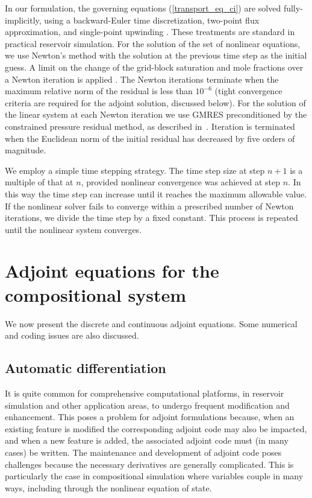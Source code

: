 \documentclass[twocolumn,numbook]{svjour3}          %
\begin{document}
In our formulation, the governing equations (\ref{transport_eq_ci}) are solved
fully-implicitly, using a backward-Euler time discretization, two-point flux
approximation, and single-point upwinding \cite{Aziz_book79}. These treatments
are standard in practical reservoir simulation. For the solution of the set of
nonlinear equations, we use Newton's method with the solution at the previous
time step as the initial guess. A limit on the change of the grid-block
saturation and mole fractions over a Newton iteration is applied
\cite{Younis:2010}. The Newton iterations terminate when the maximum relative
norm of the residual is less than $10^{-6}$ (tight convergence criteria are required for the adjoint solution, discussed below). For the solution of the
linear system at each Newton iteration we use GMRES preconditioned by the
constrained pressure residual method, as described in~\cite{CPRA}. Iteration is
terminated when the Euclidean norm of the initial residual has decreased by five
orders of magnitude.

We employ a simple time stepping strategy. The time step size at step $n+1$ is a
multiple of that at $n$, provided nonlinear convergence was achieved at step
$n$. In this way the time step can increase until it reaches the maximum
allowable value. If the nonlinear solver fails to converge within a prescribed number
of Newton iterations, we divide the time step by a fixed constant. This process
is repeated until the nonlinear system converges.



\section{Adjoint equations for the compositional system} \label{sec:adjoint}
We now present the discrete and continuous adjoint equations. Some numerical and coding issues are also discussed.


\subsection{Automatic differentiation} \label{sec:autodiff}


It is quite common for comprehensive computational platforms, in reservoir
simulation and other application areas, to undergo frequent modification and enhancement. This poses a problem for adjoint formulations
because, when an existing feature is modified the corresponding adjoint code may
also be impacted, and when a new feature is added, the associated adjoint code
must (in many cases) be written. The maintenance and development of adjoint code
poses challenges because the necessary derivatives are generally complicated.
This is particularly the case in compositional simulation where variables couple
in many ways, including through the nonlinear equation of state.
\end{document}
